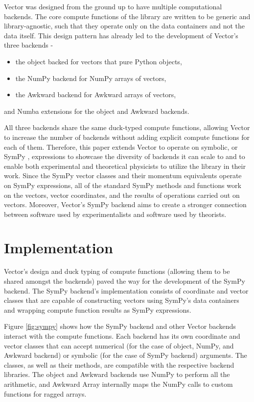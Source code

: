 \documentclass{webofc}
\begin{document}
Vector was designed from the ground up to have multiple computational backends. The core compute functions of the library are written to be generic and library-agnostic, such that they operate only on the data containers and not the data itself. This design pattern has already led to the development of Vector's three backends -

\begin{itemize}
    \item the object backed for vectors that pure Python objects,
    \item the NumPy \cite{harris:2020} backend for NumPy arrays of vectors,
    \item the Awkward \cite{Pivarski:2018} backend for Awkward arrays of vectors,
\end{itemize}

\noindent and Numba \cite{lam:2015} extensions for the object and Awkward backends.

All three backends share the same duck-typed compute functions, allowing Vector to increase the number of backends without adding explicit compute functions for each of them. Therefore, this paper extends Vector to operate on symbolic, or SymPy \cite{Meurer:2017}, expressions to showcase the diversity of backends it can scale to and to enable both experimental and theoretical physicists to utilize the library in their work. Since the SymPy vector classes and their momentum equivalents operate on SymPy expressions, all of the standard SymPy methods and functions work on the vectors, vector coordinates, and the results of operations carried out on vectors. Moreover, Vector’s SymPy backend aims to create a stronger connection between software used by experimentalists and software used by theorists.

\section{Implementation}
\label{sec-implementation}

Vector's design and duck typing of compute functions (allowing them to be shared amongst the backends) paved the way for the development of the SymPy backend. The SymPy backend's implementation consists of coordinate and vector classes that are capable of constructing vectors using SymPy's data containers and wrapping compute function results as SymPy expressions.

Figure \ref{fig:sympy} shows how the SymPy backend and other Vector backends interact with the compute functions. Each backend has its own coordinate and vector classes that can accept numerical (for the case of object, NumPy, and Awkward backend) or symbolic (for the case of SymPy backend) arguments. The classes, as well as their methods, are compatible with the respective backend libraries. The object and Awkward backends use NumPy to perform all the arithmetic, and Awkward Array internally maps the NumPy calls to custom functions for ragged arrays.
\end{document}
